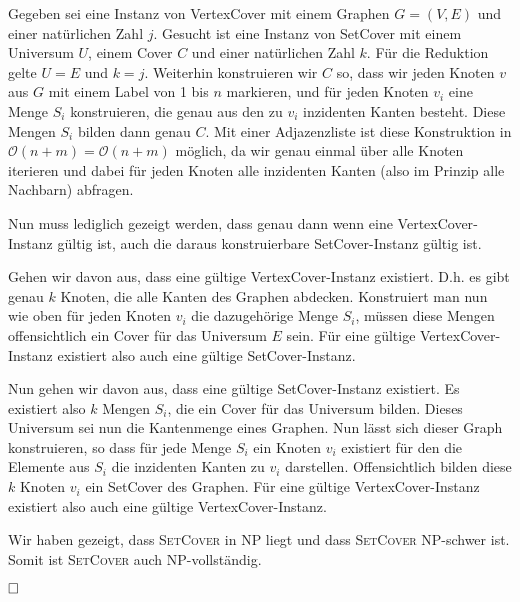 \documentclass[12pt]{scrartcl}%
\theoremstyle{nonumberplain}
\newcommand{\bO}[1]{\mathcal O(#1)}
\begin{document}
Gegeben sei eine Instanz von {\sc VertexCover} mit einem Graphen $G=(V,E)$ und einer natürlichen Zahl $j$. Gesucht ist eine Instanz von {\sc SetCover} mit einem Universum $U$, einem Cover $C$ und einer natürlichen Zahl $k$. Für die Reduktion gelte $U = E$ und $k = j$. Weiterhin konstruieren wir $C$ so, dass wir jeden Knoten $v$ aus $G$ mit einem Label von 1 bis $n$ markieren, und für jeden Knoten $v_i$ eine Menge $S_i$ konstruieren, die genau aus den zu $v_i$ inzidenten Kanten besteht. Diese Mengen $S_i$ bilden dann genau $C$. Mit einer Adjazenzliste ist diese Konstruktion in $\bO{n+m} = \bO{n+m}$ möglich, da wir genau einmal über alle Knoten iterieren und dabei für jeden Knoten alle inzidenten Kanten (also im Prinzip alle Nachbarn) abfragen.

Nun muss lediglich gezeigt werden, dass genau dann wenn eine {\sc VertexCover}-Instanz gültig ist, auch die daraus konstruierbare {\sc SetCover}-Instanz gültig ist.

Gehen wir davon aus, dass eine gültige {\sc VertexCover}-Instanz existiert. D.h. es gibt genau $k$ Knoten, die alle Kanten des Graphen abdecken. Konstruiert man nun wie oben für jeden Knoten $v_i$ die dazugehörige Menge $S_i$, müssen diese Mengen offensichtlich ein Cover für das Universum $E$ sein. Für eine gültige {\sc VertexCover}-Instanz existiert also auch eine gültige {\sc SetCover}-Instanz.

Nun gehen wir davon aus, dass eine gültige {\sc SetCover}-Instanz existiert. Es existiert also $k$ Mengen $S_i$, die ein Cover für das Universum bilden. Dieses Universum sei nun die Kantenmenge eines Graphen. Nun lässt sich dieser Graph konstruieren, so dass für jede Menge $S_i$ ein Knoten $v_i$ existiert für den die Elemente aus $S_i$ die inzidenten Kanten zu $v_i$ darstellen. Offensichtlich bilden diese $k$ Knoten $v_i$ ein {\sc SetCover} des Graphen. Für eine gültige {\sc VertexCover}-Instanz existiert also auch eine gültige {\sc VertexCover}-Instanz.

Wir haben gezeigt, dass {\scshape SetCover} in NP liegt und dass {\scshape SetCover} NP-schwer ist. Somit ist {\scshape SetCover} auch NP-vollständig.

$\hfill \square$ 
\end{document}
